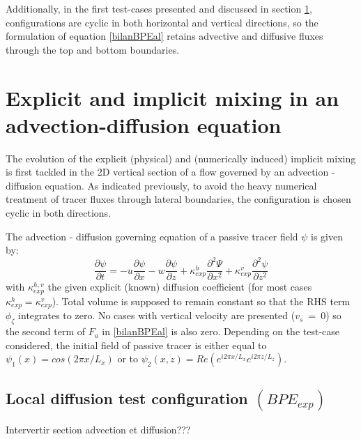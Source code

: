 Additionally, in the first test-cases presented and discussed in section \ref{section_numlab}, configurations are cyclic in both horizontal and vertical directions, so the formulation of equation \ref{bilanBPEal} retains advective and diffusive fluxes through the top and bottom boundaries.


\section{Explicit and implicit mixing in an advection-diffusion equation}
\label{section_numlab}
The evolution of the explicit (physical) and (numerically induced) implicit mixing is first tackled in the 2D vertical section of a flow governed by an advection - diffusion equation. As indicated previously, to avoid the heavy numerical treatment of tracer fluxes through lateral boundaries, the configuration is chosen cyclic in both directions.

The advection - diffusion governing equation of a passive tracer field $\psi$ is given by:
\begin{equation}
\frac{\partial \psi}{\partial t} = -u\frac{\partial \psi}{\partial x} - w\frac{\partial \psi}{\partial z} + \kappa_{exp}^h \frac{\partial^2 \Psi}{\partial x^2} + \kappa_{exp}^v \frac{\partial^2 \psi}{\partial z^2}
\label{eqAdvDiff}
\end{equation}
with $\kappa_{exp}^{h,v}$ the given explicit (known) diffusion coefficient (for most cases $\kappa_{exp}^{h}=\kappa_{exp}^{v}$).
Total volume is supposed to remain constant so that the RHS term $\phi_{\zeta}$ integrates to zero. No cases with vertical velocity are presented ($v_s\ =\ 0$) so the second term of $F_a$ in \ref{bilanBPEal} is also zero.
Depending on the test-case considered, the initial field of passive tracer is either equal to $\psi_1(x)=cos(2\pi x/L_x)$ or to $\psi_2(x,z)=Re(e^{i2\pi x/L_x}e^{i 2 \pi z/L_z})$.

\subsection{Local diffusion test configuration $(BPE_{exp})$}
\color{red} Intervertir section advection et diffusion???\color{black}

